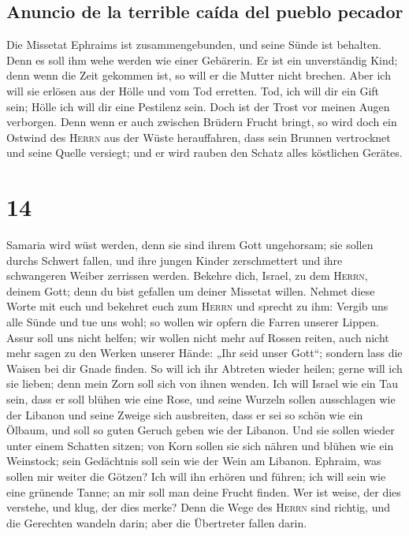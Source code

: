 \hypertarget{anuncio-de-la-terrible-cauxedda-del-pueblo-pecador}{%
\subsection{Anuncio de la terrible caída del pueblo
pecador}\label{anuncio-de-la-terrible-cauxedda-del-pueblo-pecador}}

 Die Missetat Ephraims ist zusammengebunden, und seine
Sünde ist behalten.  Denn es soll ihm wehe werden wie
einer Gebärerin. Er ist ein unverständig Kind; denn wenn die Zeit
gekommen ist, so will er die Mutter nicht brechen.  Aber
ich will sie erlösen aus der Hölle und vom Tod erretten. Tod, ich will
dir ein Gift sein; Hölle ich will dir eine Pestilenz sein. Doch ist der
Trost vor meinen Augen verborgen.  Denn wenn er auch
zwischen Brüdern Frucht bringt, so wird doch ein Ostwind des
\textsc{Herrn} aus der Wüste herauffahren, dass sein Brunnen vertrocknet
und seine Quelle versiegt; und er wird rauben den Schatz alles
köstlichen Gerätes.

\hypertarget{section-13}{%
\section{14}\label{section-13}}

 Samaria wird wüst werden, denn sie sind ihrem Gott
ungehorsam; sie sollen durchs Schwert fallen, und ihre jungen Kinder
zerschmettert und ihre schwangeren Weiber zerrissen werden.
 Bekehre dich, Israel, zu dem \textsc{Herrn}, deinem Gott;
denn du bist gefallen um deiner Missetat willen.  Nehmet
diese Worte mit euch und bekehret euch zum \textsc{Herrn} und sprecht zu
ihm: Vergib uns alle Sünde und tue uns wohl; so wollen wir opfern die
Farren unserer Lippen.  Assur soll uns nicht helfen; wir
wollen nicht mehr auf Rossen reiten, auch nicht mehr sagen zu den Werken
unserer Hände: „Ihr seid unser Gott``; sondern lass die Waisen bei dir
Gnade finden.  So will ich ihr Abtreten wieder heilen;
gerne will ich sie lieben; denn mein Zorn soll sich von ihnen wenden.
 Ich will Israel wie ein Tau sein, dass er soll blühen wie
eine Rose, und seine Wurzeln sollen ausschlagen wie der Libanon
 und seine Zweige sich ausbreiten, dass er sei so schön
wie ein Ölbaum, und soll so guten Geruch geben wie der Libanon.
 Und sie sollen wieder unter einem Schatten sitzen; von
Korn sollen sie sich nähren und blühen wie ein Weinstock; sein
Gedächtnis soll sein wie der Wein am Libanon.  Ephraim,
was sollen mir weiter die Götzen? Ich will ihn erhören und führen; ich
will sein wie eine grünende Tanne; an mir soll man deine Frucht finden.
 Wer ist weise, der dies verstehe, und klug, der dies
merke? Denn die Wege des \textsc{Herrn} sind richtig, und die Gerechten
wandeln darin; aber die Übertreter fallen darin.

